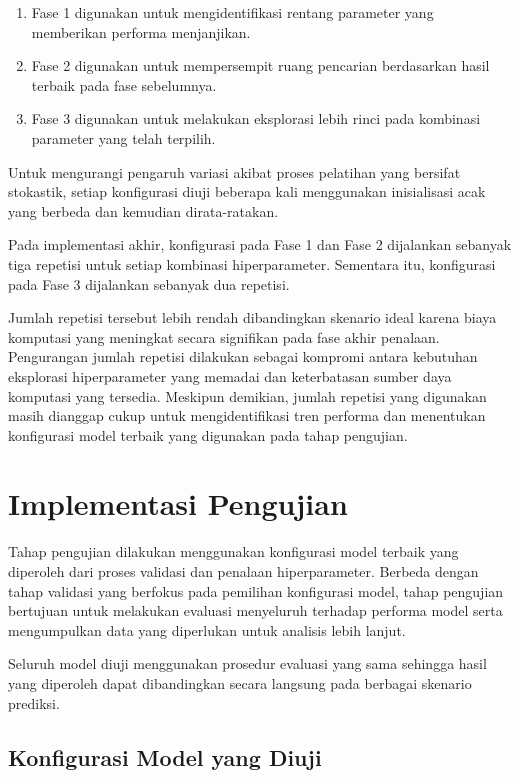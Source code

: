 \begin{enumerate}
\item Fase 1 digunakan untuk mengidentifikasi rentang parameter yang memberikan performa menjanjikan.
\item Fase 2 digunakan untuk mempersempit ruang pencarian berdasarkan hasil terbaik pada fase sebelumnya.
\item Fase 3 digunakan untuk melakukan eksplorasi lebih rinci pada kombinasi parameter yang telah terpilih.
\end{enumerate}

Untuk mengurangi pengaruh variasi akibat proses pelatihan yang bersifat stokastik, setiap konfigurasi diuji beberapa kali menggunakan inisialisasi acak yang berbeda dan kemudian dirata-ratakan.

Pada implementasi akhir, konfigurasi pada Fase 1 dan Fase 2 dijalankan sebanyak tiga repetisi untuk setiap kombinasi hiperparameter. Sementara itu, konfigurasi pada Fase 3 dijalankan sebanyak dua repetisi.

Jumlah repetisi tersebut lebih rendah dibandingkan skenario ideal karena biaya komputasi yang meningkat secara signifikan pada fase akhir penalaan. Pengurangan jumlah repetisi dilakukan sebagai kompromi antara kebutuhan eksplorasi hiperparameter yang memadai dan keterbatasan sumber daya komputasi yang tersedia. Meskipun demikian, jumlah repetisi yang digunakan masih dianggap cukup untuk mengidentifikasi tren performa dan menentukan konfigurasi model terbaik yang digunakan pada tahap pengujian.

\section{Implementasi Pengujian}

Tahap pengujian dilakukan menggunakan konfigurasi model terbaik yang diperoleh dari proses validasi dan penalaan hiperparameter. Berbeda dengan tahap validasi yang berfokus pada pemilihan konfigurasi model, tahap pengujian bertujuan untuk melakukan evaluasi menyeluruh terhadap performa model serta mengumpulkan data yang diperlukan untuk analisis lebih lanjut.

Seluruh model diuji menggunakan prosedur evaluasi yang sama sehingga hasil yang diperoleh dapat dibandingkan secara langsung pada berbagai skenario prediksi.

\subsection{Konfigurasi Model yang Diuji}

